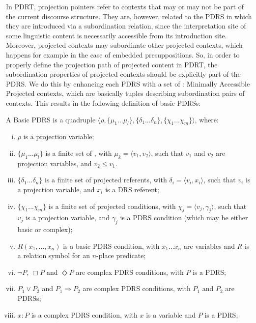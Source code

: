 In PDRT, projection pointers refer to contexts that may or may not be part
of the current discourse structure. They are, however, related to the PDRS
in which they are introduced via a subordination relation, since the
interpretation site of some linguistic content is necessarily accessible
from its introduction site. Moreover, projected contexts may subordinate
other projected contexts, which happens for example in the case of embedded
presuppositions. So, in order to properly define the projection path of
projected content in PDRT, the subordination properties of projected
contexts should be explicitly part of the PDRS. We do this by enhancing each
PDRS with a set of \MAPs: Minimally Accessible Projected contexts, which are
basically tuples describing subordination pairs of contexts. This results in
the following definition of basic PDRSs:

\begin{definition} \label{def:bPDRS}
A Basic PDRS is a quadruple $\langle \rho, \{\mu_1 ... \mu_l\}, 
\{\delta_1 ... \delta_n\}, \{\chi_1 ... \chi_m\}\rangle$, where:
  \begin{enumerate}[i.]
    \item $\rho$ is a projection variable;
    \item $\{\mu_1 ... \mu_l\}$ is a finite set of \MAPs, with $\mu_k=\langle
      v_1,v_2\rangle$, such that $v_1$ and $v_2$ are projection variables,
      and $v_2\leq v_1$.
    \item $\{\delta_1 ... \delta_n\}$ is a finite set of projected
      referents, with $\delta_i=\langle v_i, x_i\rangle$, such that $v_i$ is
      a projection variable, and $x_i$ is a DRS referent;
    \item $\{\chi_1 ... \chi_m\}$ is a finite set of projected conditions,
      with $\chi_j = \langle v_j,\gamma_j\rangle$, such that $v_j$ is a
      projection variable, and $\gamma_j$ is a PDRS condition (which may be
      either basic or complex);
    \item \label{def:bPDRS:Rel} $R(x_1, ..., x_n)$ is a basic PDRS condition,
      with $x_1 ... x_n$ are variables and $R$ is a relation symbol for an
      $n$-place predicate;
    \item $\neg P$, $\Box P$ and $\Diamond P$ are complex PDRS conditions,
      with $P$ is a PDRS;
    \item $P_1 \vee P_2$ and $P_1 \Rightarrow P_2$ are complex PDRS
      conditions, with $P_1$ and $P_2$ are PDRSs;
    \item\label{def:bPDRS:Prop} $x:P$ is a complex PDRS condition, with $x$
      is a variable and $P$ is a PDRS;
  \end{enumerate}
\end{definition}

